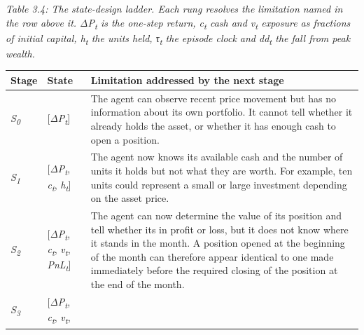 \emph{Table 3.4: The state-design ladder. Each rung resolves the
limitation named in the row above it. ΔP\textsubscript{t} is the
one-step return, c\textsubscript{t} cash and v\textsubscript{t} exposure
as fractions of initial capital, h\textsubscript{t} the units held,
τ\textsubscript{t} the episode clock and dd\textsubscript{t} the fall
from peak wealth.}

{\def\LTcaptype{none} %
\begin{longtable}[]{@{}
  >{\raggedright\arraybackslash}p{}
  >{\raggedright\arraybackslash}p{}
  >{\raggedright\arraybackslash}p{}@{}}
\toprule\noalign{}
\begin{minipage}[b]{\linewidth}\raggedright
\textbf{Stage}
\end{minipage} & \begin{minipage}[b]{\linewidth}\raggedright
\textbf{State}
\end{minipage} & \begin{minipage}[b]{\linewidth}\raggedright
\textbf{Limitation addressed by the next stage}
\end{minipage} \\
\midrule\noalign{}
\endhead
\bottomrule\noalign{}
\endlastfoot
\emph{S\textsubscript{0}} & {[}\emph{ΔP\textsubscript{t}}{]} & The agent
can observe recent price movement but has no information about its own
portfolio. It cannot tell whether it already holds the asset, or whether
it has enough cash to open a position. \\
\emph{S\textsubscript{1}} & {[}\emph{ΔP\textsubscript{t}},
\emph{c\textsubscript{t}}, \emph{h\textsubscript{t}}{]} & The agent now
knows its available cash and the number of units it holds but not what
they are worth. For example, ten units could represent a small or large
investment depending on the asset price. \\
\emph{S\textsubscript{2}} & {[}\emph{ΔP\textsubscript{t}},
\emph{c\textsubscript{t}}, \emph{v\textsubscript{t}},
\emph{PnL\textsubscript{t}}{]} & The agent can now determine the value
of its position and tell whether its in profit or loss, but it does not
know where it stands in the month. A position opened at the beginning of
the month can therefore appear identical to one made immediately before
the required closing of the position at the end of the month. \\
\emph{S\textsubscript{3}} & {[}\emph{ΔP\textsubscript{t}},
\emph{c\textsubscript{t}}, \emph{v\textsubscript{t}},

\end{longtable}}
